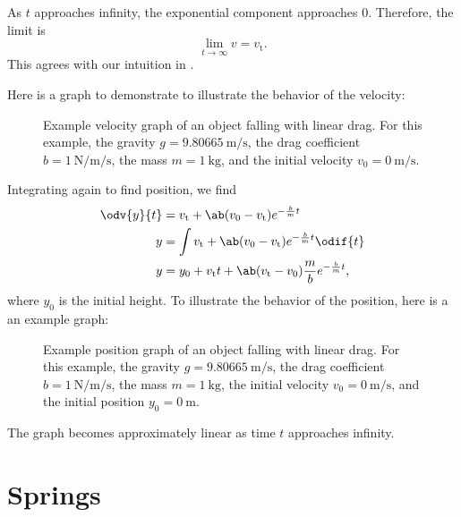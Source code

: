 As \(t\) approaches infinity, the exponential component approaches 0.
Therefore, the limit is
\begin{equation*}
    \lim_{t \to \infty} v = v_\mathrm{t}.
\end{equation*}
This agrees with our intuition in .

Here is a graph to demonstrate to illustrate the behavior of the velocity:
\begin{figure}[ht]
    \centering
    \resizebox{\textwidth}{!}{}
    \caption{
        Example velocity graph of an object falling with linear drag.
        For this example,
        the gravity \(g = \qty{9.80665}{\metre \per \second}\),
        the drag coefficient \(b = \qty{1}{\newton \per \metre \per \second}\),
        the mass \(m = \qty{1}{\kilogram}\),
        and the initial velocity \(v_0 = \qty{0}{\metre \per \second}\).
    }
\end{figure}

Integrating again to find position, we find
\begin{equation}
    \begin{aligned}
        \odv{y}{t} &= v_\mathrm{t} + \ab( v_0 - v_\mathrm{t} ) e^{-
        \frac{b}{m} t} \\
        y &= \int v_\mathrm{t} + \ab( v_0 - v_\mathrm{t} ) e^{-
        \frac{b}{m} t} \odif{t} \\
        y &= y_0
        + v_\mathrm{t} t
        + \ab( v_\mathrm{t} - v_0 )
        \frac{m}{b}
        e^{- \frac{b}{m} t},
    \end{aligned}
\end{equation}
where \(y_0\) is the initial height.
To illustrate the behavior of the position, here is a an example graph:
\begin{figure}[ht]
    \centering
    \resizebox{\textwidth}{!}{}
    \caption{
        Example position graph of an object falling with linear drag.
        For this example,
        the gravity \(g = \qty{9.80665}{\metre \per \second}\),
        the drag coefficient \(b = \qty{1}{\newton \per \metre \per \second}\),
        the mass \(m = \qty{1}{\kilogram}\),
        the initial velocity \(v_0 = \qty{0}{\metre \per \second}\),
        and the initial position \(y_0 = \qty{0}{\metre}\).
    }
\end{figure}
The graph becomes approximately linear as time \(t\) approaches infinity.

\section{Springs}

